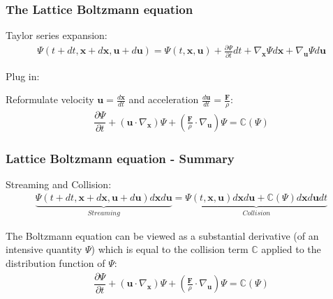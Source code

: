 \documentclass[10pt,handout]{beamer}
\begin{document}
\begin{frame}\frametitle{The Lattice Boltzmann equation}

Taylor series expansion:
\begin{eqnarray} 
	 \Psi(t +dt, \textbf{x} + d\textbf{x}, \textbf{u} + d\textbf{u}) =
	 \Psi(t, \textbf{x}, \textbf{u}) + \frac{\partial \Psi}{\partial t} dt + 
	 \nabla_{\textbf{x}}\Psi d\textbf{x} +
	 \nabla_{\textbf{u}}\Psi d\textbf{u} \nonumber
\end{eqnarray}

\pause
Plug in:

\pause
Reformulate velocity $ \textbf{u} = \frac{d\textbf{x} }{dt}$ and acceleration 
$ \frac{d \textbf{u}}{dt} =  \frac{\textbf{F}}{\rho}$:
\begin{eqnarray} \label{Boltzmann_equation_withForce}
	\dfrac{\partial \Psi}{\partial t} + (\textbf{u} \cdot \nabla_{\textbf{x}}) \Psi +
	 (\frac{\textbf{F}}{\rho} \cdot \nabla_{\textbf{u}}) \Psi 
	 = \mathbb{C}(\Psi) \nonumber
\end{eqnarray}
\end{frame} 

\begin{frame}\frametitle{Lattice Boltzmann equation - Summary}
Streaming and Collision:
\begin{eqnarray}
	 \underbrace{ \Psi(t +dt, \textbf{x} + d\textbf{x}, \textbf{u} + d\textbf{u})  d\textbf{x} d\textbf{u} }_{Streaming}=
	 \underbrace{\Psi(t, \textbf{x}, \textbf{u}) d\textbf{x} d\textbf{u} + \mathbb{C}(\Psi)  d\textbf{x} d\textbf{u} dt}_{Collision}  \nonumber
\end{eqnarray} 

The Boltzmann equation can be viewed as a substantial derivative (of an intensive quantity $\Psi$) which is equal to the collision term $ \mathbb{C}$ applied to the distribution function of $\Psi$:
\begin{eqnarray}
	\dfrac{\partial \Psi}{\partial t} + (\textbf{u} \cdot \nabla_{\textbf{x}}) \Psi +
	 (\frac{\textbf{F}}{\rho} \cdot \nabla_{\textbf{u}}) \Psi 
	 = \mathbb{C}(\Psi) \nonumber
\end{eqnarray}
\end{frame}
\end{document}
